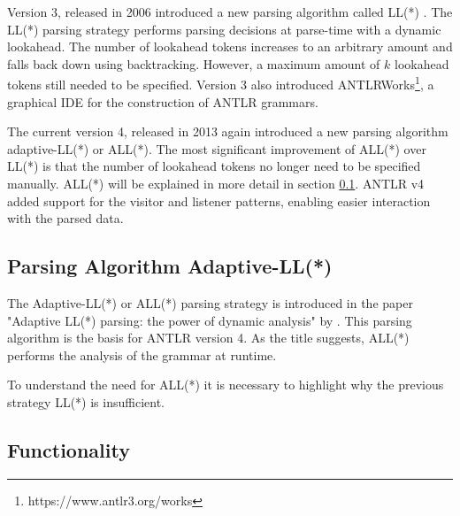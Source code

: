 Version 3, released in 2006 introduced a new parsing algorithm called LL(*) \parencite{LLSParsing2011}. The LL(*) parsing strategy performs parsing decisions at parse-time with a dynamic lookahead. The number of lookahead tokens increases to an arbitrary amount and falls back down using backtracking. However, a maximum amount of $k$ lookahead tokens still needed to be specified. Version 3 also introduced ANTLRWorks\footnote{https://www.antlr3.org/works}, a graphical IDE for the construction of ANTLR grammars.

The current version 4, released in 2013 again introduced a new parsing algorithm adaptive-LL(*) or ALL(*). The most significant improvement of ALL(*) over LL(*) is that the number of lookahead tokens no longer need to be specified manually. ALL(*) will be explained in more detail in section \ref{sec:allstar}. ANTLR v4 added support for the visitor and listener patterns, enabling easier interaction with the parsed data. 

\subsection{Parsing Algorithm Adaptive-LL(*)}
\label{sec:allstar}

The Adaptive-LL(*) or ALL(*) parsing strategy is introduced in the paper "Adaptive LL(*) parsing: the power of dynamic analysis" by \textcite{ALLParsing2014}. This parsing algorithm is the basis for ANTLR version 4. As the title suggests, ALL(*) performs the analysis of the grammar at runtime. 

To understand the need for ALL(*) it is necessary to highlight why the previous strategy LL(*) is insufficient. 

\subsection{Functionality}

